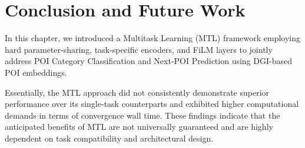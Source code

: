 \section{Conclusion and Future Work}
\label{sec:cbic:conclusion}

In this chapter, we introduced a Multitask Learning (MTL) framework employing hard parameter-sharing, task-specific encoders, and FiLM layers to jointly address POI Category Classification and Next-POI Prediction using DGI-based POI embeddings.

Essentially, the MTL approach did not consistently demonstrate superior performance over its single-task counterparts and exhibited higher computational demands in terms of convergence wall time. These findings indicate that the anticipated benefits of MTL are not universally guaranteed and are highly dependent on task compatibility and architectural design.

